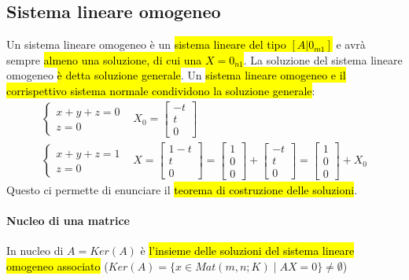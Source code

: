 \subsection{Sistema lineare omogeneo}
Un sistema lineare omogeneo è un \hl{sistema lineare del tipo $[A|0_{m1}]$} e avrà
sempre \hl{almeno una soluzione, di cui una $X=0_{n1}$}. La soluzione del sistema
lineare omogeneo \hl{è detta soluzione generale}. Un \hl{sistema lineare omogeneo e
il corrispettivo sistema normale condividono la soluzione generale}:
\begin{align*}
    \begin{cases}
        x + y + z = 0 \\
        z = 0
    \end{cases} & X_0 =
    \begin{bmatrix}
        -t \\
        t \\
        0
    \end{bmatrix} \\
    \begin{cases}
        x + y + z = 1 \\
        z = 0
    \end{cases} & X =
    \begin{bmatrix}
        1-t \\
        t \\
        0
    \end{bmatrix} =
    \begin{bmatrix}
        1 \\
        0 \\
        0
    \end{bmatrix} +
    \begin{bmatrix}
        -t \\
        t \\
        0
    \end{bmatrix} =
    \begin{bmatrix}
        1 \\
        0 \\
        0
    \end{bmatrix} + X_0
\end{align*}
Questo ci permette di enunciare il \hl{teorema di costruzione delle soluzioni}.

\paragraph{Nucleo di una matrice} In nucleo di $A = Ker(A)$ è \hl{l'insieme delle
soluzioni del sistema lineare omogeneo associato}
($Ker(A) = \{x \in Mat(m,n;K) \mid AX = 0\} \neq \emptyset$)

